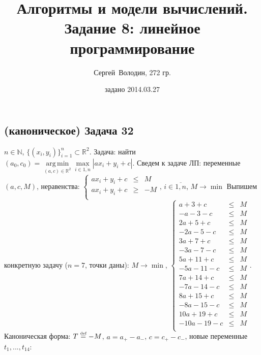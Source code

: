 \documentclass[a4paper]{article}
\date{задано 2014.03.27}
\author{Сергей~Володин, 272 гр.}
\title{Алгоритмы и модели вычислений.\\Задание 8: линейное программирование}
\DeclareMathOperator*{\argmin}{arg\,min}
\def\eqdef{\overset{\mbox{\tiny def}}{=}}
\newcommand{\NN}{\mathbb{N}}
\newcommand{\RR}{\mathbb{R}}
\begin{document}
\maketitle
\subsection*{(каноническое) Задача 32}
$n\in\NN$, $\{(x_i,y_i)\}_{i=1}^n\subset\RR^2$. Задача: найти $(a_0,c_0)=\argmin\limits_{(a,c)\in\RR^2}\max\limits_{i\in\overline{1,n}}|ax_i+y_i+c|$.\newline
Сведем к задаче ЛП: переменные $(a,c,M)$, неравенства: $\left\{\begin{array}{lcr}
ax_i+y_i+c& \leqslant &M\\
ax_i+y_i+c&\geqslant &-M\\
\end{array}\right.,\,i\in\overline{1,n}$, $M\to\min$\newline
Выпишем конкретную задачу ($n=7$, точки даны):\newline
$M\to\min$,
$\left\{\begin{array}{lcr}
a+3+c & \leqslant & M\\
-a-3-c & \leqslant & M\\

2a+5+c & \leqslant & M\\
-2a-5-c & \leqslant & M\\

3a+7+c & \leqslant & M\\
-3a-7-c & \leqslant & M\\

5a+11+c & \leqslant & M\\
-5a-11-c & \leqslant & M\\

7a+14+c & \leqslant & M\\
-7a-14-c & \leqslant & M\\

8a+15+c & \leqslant & M\\
-8a-15-c & \leqslant & M\\

10a+19+c & \leqslant & M\\
-10a-19-c & \leqslant & M\\
\end{array}\right.
$. Каноническая форма: $T\eqdef -M$, $a=a_+-a_-$, $c=c_+-c_-$, новые переменные $t_1,...,t_{14}$:\newline
\end{document}
